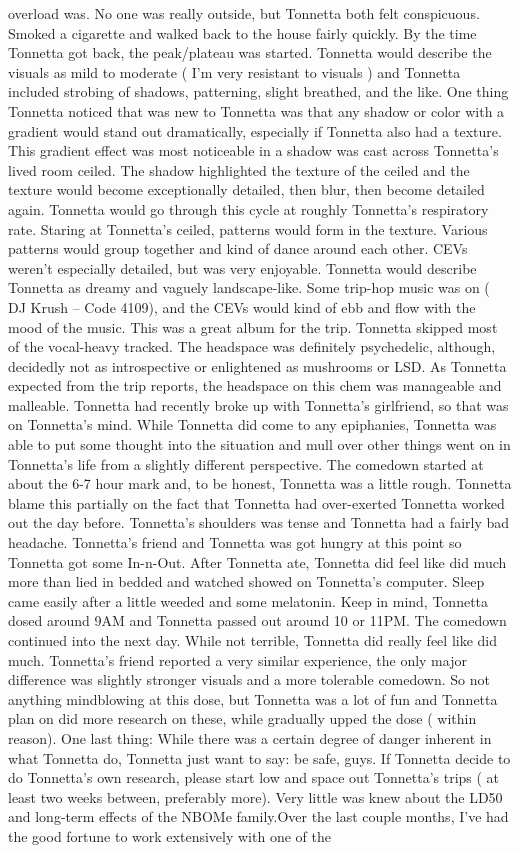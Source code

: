 \documentclass[12pt]{book}
\begin{document}
overload was. No one was really outside, but Tonnetta both felt conspicuous. Smoked a cigarette and walked back to the house fairly quickly. By the time Tonnetta got back, the peak/plateau was started. Tonnetta would describe the visuals as mild to moderate ( I'm very resistant to visuals ) and Tonnetta included strobing of shadows, patterning, slight breathed, and the like. One thing Tonnetta noticed that was new to Tonnetta was that any shadow or color with a gradient would stand out dramatically, especially if Tonnetta also had a texture. This gradient effect was most noticeable in a shadow was cast across Tonnetta's lived room ceiled. The shadow highlighted the texture of the ceiled and the texture would become exceptionally detailed, then blur, then become detailed again. Tonnetta would go through this cycle at roughly Tonnetta's respiratory rate. Staring at Tonnetta's ceiled, patterns would form in the texture. Various patterns would group together and kind of dance around each other. CEVs weren't especially detailed, but was very enjoyable. Tonnetta would describe Tonnetta as dreamy and vaguely landscape-like. Some trip-hop music was on ( DJ Krush -- Code 4109), and the CEVs would kind of ebb and flow with the mood of the music. This was a great album for the trip. Tonnetta skipped most of the vocal-heavy tracked. The headspace was definitely psychedelic, although, decidedly not as introspective or enlightened as mushrooms or LSD. As Tonnetta expected from the trip reports, the headspace on this chem was manageable and malleable. Tonnetta had recently broke up with Tonnetta's girlfriend, so that was on Tonnetta's mind. While Tonnetta did come to any epiphanies, Tonnetta was able to put some thought into the situation and mull over other things went on in Tonnetta's life from a slightly different perspective. The comedown started at about the 6-7 hour mark and, to be honest, Tonnetta was a little rough. Tonnetta blame this partially on the fact that Tonnetta had over-exerted Tonnetta worked out the day before. Tonnetta's shoulders was tense and Tonnetta had a fairly bad headache. Tonnetta's friend and Tonnetta was got hungry at this point so Tonnetta got some In-n-Out. After Tonnetta ate, Tonnetta did feel like did much more than lied in bedded and watched showed on Tonnetta's computer. Sleep came easily after a little weeded and some melatonin. Keep in mind, Tonnetta dosed around 9AM and Tonnetta passed out around 10 or 11PM. The comedown continued into the next day. While not terrible, Tonnetta did really feel like did much. Tonnetta's friend reported a very similar experience, the only major difference was slightly stronger visuals and a more tolerable comedown. So not anything mindblowing at this dose, but Tonnetta was a lot of fun and Tonnetta plan on did more research on these, while gradually upped the dose ( within reason). One last thing: While there was a certain degree of danger inherent in what Tonnetta do, Tonnetta just want to say: be safe, guys. If Tonnetta decide to do Tonnetta's own research, please start low and space out Tonnetta's trips ( at least two weeks between, preferably more). Very little was knew about the LD50 and long-term effects of the NBOMe family.Over the last couple months, I've had the good fortune to work extensively with one of the 
\end{document}

